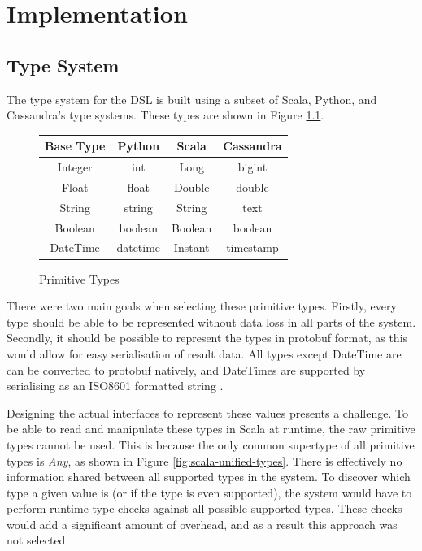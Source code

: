\chapter{Implementation}



\section{Type System}
The type system for the DSL is built using a subset of Scala, Python, and Cassandra's type systems. These types are shown in Figure \ref{fig:datatypes}.

\begin{figure}[h]
	\centering
	\begin{tabular}{| c | c | c | c |}
		\hline
		\textbf{Base Type} & \textbf{Python} & \textbf{Scala} & \textbf{Cassandra} \\ \hline
		Integer & int & Long & bigint \\ \hline
		Float & float & Double & double \\ \hline
		String & string & String & text \\ \hline
		Boolean & boolean & Boolean & boolean \\ \hline
		DateTime & datetime & Instant & timestamp \\ \hline
	\end{tabular}
	\caption{Primitive Types}
	\label{fig:datatypes}
\end{figure}

There were two main goals when selecting these primitive types. Firstly, every type should be able to be represented without data loss in all parts of the system. Secondly, it should be possible to represent the types in protobuf format, as this would allow for easy serialisation of result data. All types except DateTime are can be converted to protobuf natively, and DateTimes are supported by serialising as an ISO8601 formatted string \cite{iso_8601}.

Designing the actual interfaces to represent these values presents a challenge. To be able to read and manipulate these types in Scala at runtime, the raw primitive types cannot be used. This is because the only common supertype of all primitive types is \textit{Any}, as shown in Figure \ref{fig:scala-unified-types}. There is effectively no information shared between all supported types in the system. To discover which type a given value is (or if the type is even supported), the system would have to perform runtime type checks against all possible supported types. These checks would add a significant amount of overhead, and as a result this approach was not selected.

